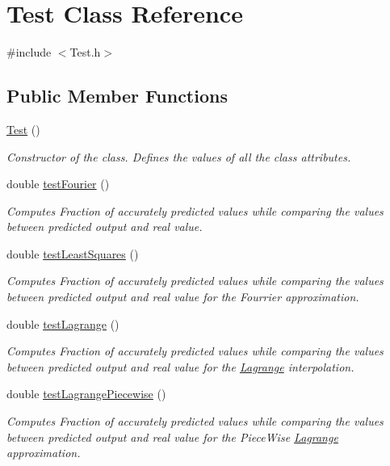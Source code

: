 \hypertarget{class_test}{}\section{Test Class Reference}
\label{class_test}


{\ttfamily \#include $<$Test.\+h$>$}

\subsection*{Public Member Functions}
\begin{DoxyCompactItemize}
\item 
\mbox{\hyperlink{class_test_a99f2bbfac6c95612322b0f10e607ebe5}{Test}} ()
\begin{DoxyCompactList}\small\item\em Constructor of the class. Defines the values of all the class attributes. \end{DoxyCompactList}\item 
double \mbox{\hyperlink{class_test_a4789b9d0192ae0a3c6f88a7777a6bc57}{test\+Fourier}} ()
\begin{DoxyCompactList}\small\item\em Computes Fraction of accurately predicted values while comparing the values between predicted output and real value. \end{DoxyCompactList}\item 
double \mbox{\hyperlink{class_test_a822cf87174e675d0c0f3e2c9d4d8344b}{test\+Least\+Squares}} ()
\begin{DoxyCompactList}\small\item\em Computes Fraction of accurately predicted values while comparing the values between predicted output and real value for the Fourrier approximation. \end{DoxyCompactList}\item 
double \mbox{\hyperlink{class_test_ae43e2b7e77bbd96d43684c78ca4ee836}{test\+Lagrange}} ()
\begin{DoxyCompactList}\small\item\em Computes Fraction of accurately predicted values while comparing the values between predicted output and real value for the \mbox{\hyperlink{class_lagrange}{Lagrange}} interpolation. \end{DoxyCompactList}\item 
double \mbox{\hyperlink{class_test_a3dd2e280b828fac8d1509d04d46ddb84}{test\+Lagrange\+Piecewise}} ()
\begin{DoxyCompactList}\small\item\em Computes Fraction of accurately predicted values while comparing the values between predicted output and real value for the Piece\+Wise \mbox{\hyperlink{class_lagrange}{Lagrange}} approximation. \end{DoxyCompactList}\item 

\end{DoxyCompactItemize}
